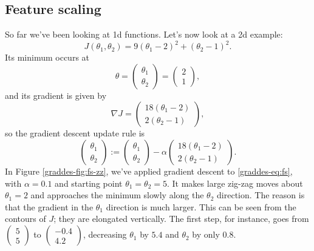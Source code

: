 \documentclass{article}
\theoremstyle{definition}
\begin{document}
\subsection{Feature scaling}
So far we've been looking at 1d functions. Let's now look at a 2d example:
\begin{equation}
    J(\theta_1, \theta_2)=9(\theta_1 - 2)^2+(\theta_2 - 1)^2.
    \label{graddes-eq:fs}
\end{equation}
Its minimum occurs at
\begin{equation*}
   \theta=\begin{pmatrix}\theta_1\\\theta_2\end{pmatrix}=\begin{pmatrix}2\\1\end{pmatrix},
\end{equation*}
and its gradient is given by
\begin{equation*}
    \nabla J = \begin{pmatrix}18(\theta_1-2)\\2(\theta_2-1)\end{pmatrix},
\end{equation*}
so the gradient descent update rule is
\begin{equation*}
   \begin{pmatrix}\theta_1\\\theta_2\end{pmatrix} := \begin{pmatrix}\theta_1\\\theta_2\end{pmatrix} - \alpha\begin{pmatrix}18(\theta_1-2)\\2(\theta_2-1)\end{pmatrix}.
\end{equation*}
In Figure \ref{graddes-fig:fs-zz}, we've applied gradient descent to \eqref{graddes-eq:fs}, with $\alpha=0.1$ and starting point $\theta_1=\theta_2=5$. It makes large zig-zag moves about $\theta_1=2$ and approaches the minimum slowly along the $\theta_2$ direction. The reason is that the gradient in the $\theta_1$ direction is much larger. This can be seen from the contours of $J$; they are elongated vertically. The first step, for instance, goes from $\begin{pmatrix}5\\5\end{pmatrix}$ to $\begin{pmatrix}-0.4\\4.2\end{pmatrix}$, decreasing $\theta_1$ by $5.4$ and $\theta_2$ by only $0.8$.
\end{document}
